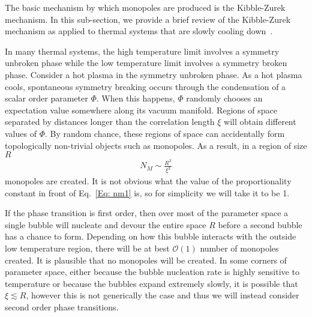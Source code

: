 \documentclass[superscriptaddress,groupedaddress,nofootnoteinbib,11pt]{article}
\newcommand\eea{\end{eqnarray}}
\newcommand\bea{\begin{eqnarray}}
\begin{document}
The basic mechanism by which monopoles are produced is the Kibble-Zurek mechanism.  In this sub-section, we provide a brief review of the Kibble-Zurek mechanism as applied to thermal systems that are slowly cooling down~\cite{Murayama:2009nj}.

In many thermal systems, the high temperature limit involves a symmetry unbroken phase while the low temperature limit involves a symmetry broken phase.  Consider a hot plasma in the symmetry unbroken phase.
As a hot plasma cools, spontaneous symmetry breaking occurs through the condensation of a scalar order parameter $\Phi$.  When this happens, $\Phi$ randomly chooses an expectation value somewhere along its vacuum manifold.  
Regions of space separated by distances longer than the correlation length $\xi$ will obtain different values of $\Phi$.  By random chance, these regions of space can accidentally form topologically non-trivial objects such as monopoles.  As a result, in a region of size $R$
\bea
\label{Eq: nm1}
N_M \sim \frac{R^3}{\xi^3}
\eea
monopoles are created.  It is not obvious what the value of the proportionality constant in front of Eq.~\ref{Eq: nm1} is, so for simplicity we will take it to be 1.

If the phase transition is first order, then over most of the parameter space a single bubble will nucleate and devour the entire space $R$ before a second bubble has a chance to form.  Depending on how this bubble interacts with the outside low temperature region, there will be at best $\mathcal{O}(1)$ number of monopoles created.  It is plausible that no monopoles will be created.  In some corners of parameter space, either because the bubble nucleation rate is highly sensitive to temperature or because the bubbles expand extremely slowly, it is possible that $\xi \lesssim R$, however this is not generically the case and thus we will instead consider second order phase transitions.
\end{document}
